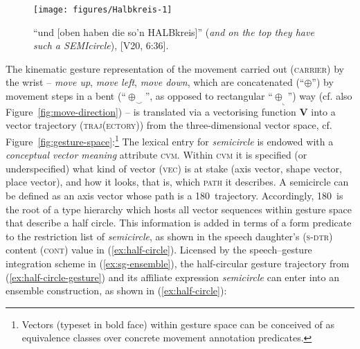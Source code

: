 \documentclass[output=paper
 	        ,biblatex
                ,babelshorthands
                ,newtxmath
                ,draftmode
                ,colorlinks, citecolor=brown
]{langscibook}
\begin{document}
\begin{figure}
  \centering
  \texttt{[image: figures/Halbkreis-1]}
  \caption[]{\enquote{und [oben haben die so'n HALBkreis]} (\textit{and on the top they have such a SEMIcircle}), [V20, 6:36].}
  \label{fig:halbkreis}
\end{figure}

The kinematic gesture representation of the movement carried out (\textsc{carrier})  by the wrist  -- \textit{move up}, \textit{move left}, \textit{move down}, which are concatenated (``$\oplus$'') by movement steps in a bent (\enquote{\ensuremath{\oplus_\smallsmile}}, as opposed to rectangular \enquote{\ensuremath{\oplus_\llcorner}}) way (cf. also Figure~\ref{fig:move-direction}) -- is translated via a vectorising function \textbf{V} into a vector trajectory (\textsc{traj(ectory)})  from the three-dimensional vector space, cf. Figure~\ref{fig:gesture-space}:\footnote{Vectors (typeset in bold face) within gesture space can be conceived of as equivalence classes over concrete movement annotation predicates.}
%
\ea \label{ex:half-circle-gesture}
\z
%
The lexical entry for \textit{semicircle} is endowed with a \emph{conceptual vector meaning} attribute \textsc{cvm}.
%
Within \textsc{cvm} it is specified (or underspecified) what kind of vector (\textsc{vec})  is at stake (axis vector, shape vector, place vector), and how it looks, that is, which \textsc{path}  it describes.
%
A semicircle can be defined as an axis vector whose path is a 180\textdegree\ trajectory.
%
Accordingly, 180\textdegree\ is the root of a type hierarchy which hosts all vector sequences within gesture space that describe a half circle. 
%
This information is added in terms of a form predicate to the restriction list of \textit{semicircle}, as shown in the speech daughter's (\textsc{s-dtr})  content (\textsc{cont}) value in (\ref{ex:half-circle}).
%
Licensed by the speech--gesture integration scheme in (\ref{ex:sg-ensemble}), the half-circular gesture trajectory from (\ref{ex:half-circle-gesture}) and its affiliate expression \textit{semicircle} can enter into an ensemble construction, as shown in (\ref{ex:half-circle}):
\end{document}
